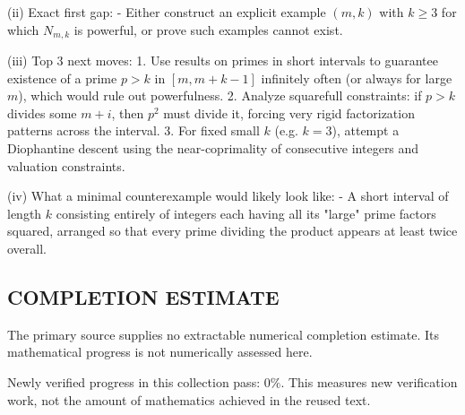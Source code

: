 (ii) Exact first gap:
- Either construct an explicit example $(m,k)$ with $k\ge 3$ for which $N_{m,k}$ is powerful, or prove such examples cannot exist.

(iii) Top 3 next moves:
1. Use results on primes in short intervals to guarantee existence of a prime $p>k$ in $[m,m+k-1]$ infinitely often (or always for large $m$), which would rule out powerfulness.
2. Analyze squarefull constraints: if $p>k$ divides some $m+i$, then $p^2$ must divide it, forcing very rigid factorization patterns across the interval.
3. For fixed small $k$ (e.g. $k=3$), attempt a Diophantine descent using the near-coprimality of consecutive integers and valuation constraints.

(iv) What a minimal counterexample would likely look like:
- A short interval of length $k$ consisting entirely of integers each having all its "large" prime factors squared, arranged so that every prime dividing the product appears at least twice overall.



\subsection*{COMPLETION ESTIMATE}
The primary source supplies no extractable numerical completion estimate. Its mathematical progress is not numerically assessed here.

Newly verified progress in this collection pass: $0\%$. This measures new verification work, not the amount of mathematics achieved in the reused text.
